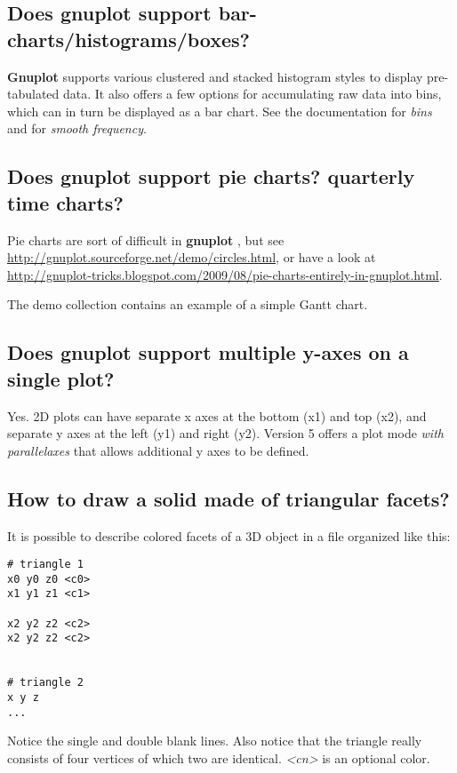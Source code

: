 \documentclass[a4paper,11pt]{article}
\def\http#1{{\small\href{http://#1}{\url{http://#1}}}}
\newcommand{\http}[1]%
            {\htmladdnormallink{\latex{\url{http://#1}}%
                    \html{\textit{http://#1}}}%
                {http://#1}%
            }
\newcommand{\gnuplot}{\textbf{gnuplot }}
\newcommand{\Gnuplot}{\textbf{Gnuplot }}
\begin{document}
\subsection{Does \gnuplot support bar-charts/histograms/boxes?}

\Gnuplot{} supports various clustered and stacked histogram styles to display
pre-tabulated data.  It also offers a few options for accumulating raw data
into bins, which can in turn be displayed as a bar chart.  See the documentation
for \textit{bins} and for \textit{smooth frequency}.

\subsection{Does \gnuplot support pie charts? quarterly time charts?}

Pie charts are sort of difficult in \gnuplot, but see
\http{gnuplot.sourceforge.net/demo/circles.html},
or have a look at
\http{gnuplot-tricks.blogspot.com/2009/08/pie-charts-entirely-in-gnuplot.html}.

The demo collection contains an example of a simple Gantt chart.

\subsection{Does \gnuplot support multiple y-axes on a single plot?}

Yes. 2D plots can have separate x axes at the bottom (x1) and top (x2),
and separate y axes at the left (y1) and right (y2).  Version 5 offers a
plot mode \textit{with parallelaxes} that allows additional y axes to be
defined.

\subsection{How to draw a solid made of triangular facets?}

It is possible to describe colored facets of a 3D object in a file
organized like this:
\small
\begin{verbatim}
# triangle 1
x0 y0 z0 <c0>
x1 y1 z1 <c1>

x2 y2 z2 <c2>
x2 y2 z2 <c2>


# triangle 2
x y z
...
\end{verbatim}
\normalsize

Notice the single and double blank lines. Also notice that the triangle
really consists of four vertices of which two are identical.
\textit{<cn>} is an optional color.
\end{document}
